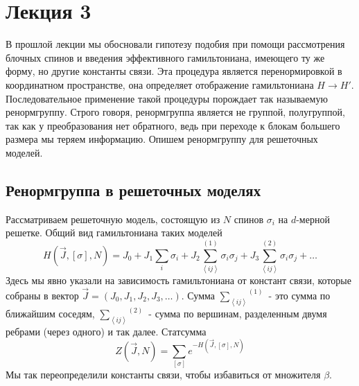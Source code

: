 \documentclass[a4paper,12pt]{article}
\theoremstyle{definition}
\theoremstyle{definition}
\theoremstyle{definition}
\begin{document}
\section{Лекция 3}
\label{sec:lecture-3}
В прошлой лекции мы обосновали гипотезу подобия при помощи рассмотрения блочных спинов и введения эффективного гамильтониана, имеющего ту же форму, но другие константы связи. Эта процедура является перенормировкой в координатном пространстве, она определяет отображение гамильтониана $H\to H'$. Последовательное применение такой процедуры порождает так называемую ренормгруппу. Строго говоря, ренормгруппа является не группой, полугруппой, так как у преобразования нет обратного, ведь при переходе к блокам большего размера мы теряем информацию. 
Опишем ренормгруппу для решеточных моделей.

\subsection{Ренормгруппа в решеточных моделях}
\label{sec:renormgroup-lattice-models}
Рассматриваем решеточную модель, состоящую из $N$ спинов $\sigma_i$ на $d$-мерной решетке. Общий вид гамильтониана таких моделей
\begin{equation}
  \label{eq:55}
  H(\vec J,[\sigma],N)=J_0 + J_1\sum_i \sigma_i +J_2\overset{(1)}{\sum_{\left<ij\right>}}\sigma_i \sigma_j+J_3\overset{(2)}{\sum_{\left<ij\right>}}\sigma_i \sigma_j + \dots
\end{equation}
Здесь мы явно указали на зависимость гамильтониана от констант связи, которые собраны в вектор $\vec J=(J_0,J_1,J_2,J_3,\dots)$. Сумма $\overset{(1)}{\sum_{\left<ij\right>}}$ - это сумма по ближайшим соседям, $\overset{(2)}{\sum_{\left<ij\right>}}$ - сумма по вершинам, разделенным двумя ребрами (через одного) и так далее. 
Статсумма
\begin{equation}
  \label{eq:56}
  Z(\vec J,N)=\sum_{[\sigma]}e^{-H(\vec J,[\sigma],N)}
\end{equation}
Мы так переопределили константы связи, чтобы избавиться от множителя $\beta$.
\end{document}
